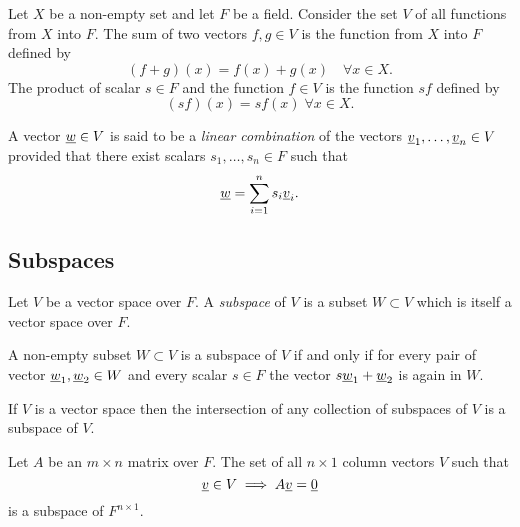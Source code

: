 \begin{example}
Let $X$ be a non-empty set and let $F$ be a field.
Consider the set $V$ of all functions from $X$ into $F$.
The sum of two vectors $f,g \in V$ is the function from $X$ into $F$ defined by
\begin{equation*}
(f + g)(x) = f(x) + g(x) \quad \forall x \in X.
\end{equation*}
The product of scalar $s \in F$ and the function $f \in V$ is the function $sf$ defined by
\begin{equation*}
(sf)(x) = s f(x) \; \forall x \in X.
\end{equation*}
\end{example}

\begin{definition}
A vector $\underline{w} \in V$ is said to be a \emph{linear combination} of the vectors $\underline{v}_1, \ldots, \underline{v}_n \in V$ provided that there exist scalars $s_1, \ldots, s_n \in F$ such that
\begin{equation*}
\underline{w} = \sum_{i=1}^n s_i \underline{v}_i.
\end{equation*}
\end{definition}


\subsection{Subspaces}

\begin{definition}
Let $V$ be a vector space over $F$.
A \emph{subspace} of $V$ is a subset $W \subset V$ which is itself a vector space over $F$.
\end{definition}

\begin{fact}
A non-empty subset $W \subset V$ is a subspace of $V$ if and only if for every pair of vector $\underline{w}_1, \underline{w}_2 \in W$ and every scalar $s \in F$ the vector $s \underline{w}_1 + \underline{w}_2$ is again in $W$.
\end{fact}
If $V$ is a vector space then the intersection of any collection of subspaces of $V$ is a subspace of $V$.

\begin{example}
Let $A$ be an $m \times n$ matrix over $F$.
The set of all $n \times 1$ column vectors $V$ such that
\begin{equation*}
\underline{v} \in V \implies A \underline{v} = \underline{0}
\end{equation*}
is a subspace of $F^{n \times 1}$.
\end{example}

